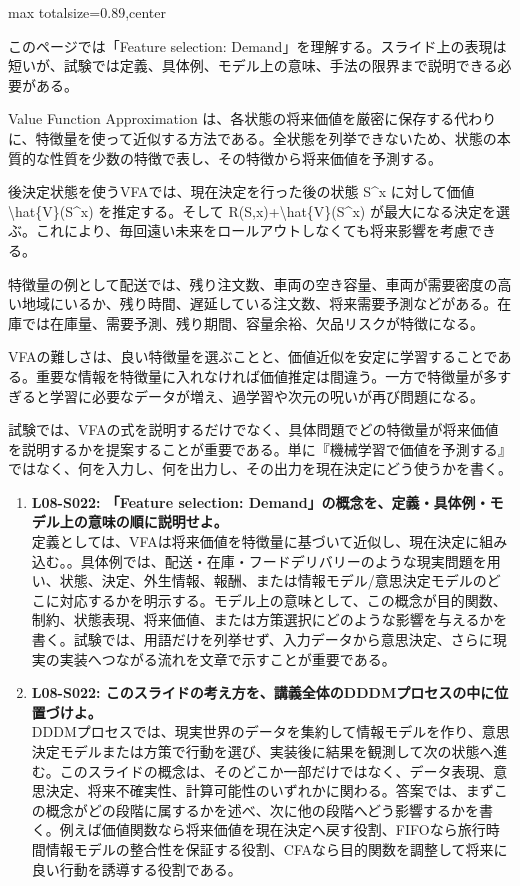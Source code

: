 \begin{minipage}[t]{0.58\textwidth}
\begin{adjustbox}{max totalsize={\textwidth}{0.89\textheight},center}
\begin{minipage}{\textwidth}\scriptsize
{}このページでは「Feature selection: Demand」を理解する。スライド上の表現は短いが、試験では定義、具体例、モデル上の意味、手法の限界まで説明できる必要がある。\par
Value Function Approximation は、各状態の将来価値を厳密に保存する代わりに、特徴量を使って近似する方法である。全状態を列挙できないため、状態の本質的な性質を少数の特徴で表し、その特徴から将来価値を予測する。\par
後決定状態を使うVFAでは、現在決定を行った後の状態 S\textasciicircum{}x に対して価値 \textbackslash{}hat\{V\}(S\textasciicircum{}x) を推定する。そして R(S,x)+\textbackslash{}hat\{V\}(S\textasciicircum{}x) が最大になる決定を選ぶ。これにより、毎回遠い未来をロールアウトしなくても将来影響を考慮できる。\par
特徴量の例として配送では、残り注文数、車両の空き容量、車両が需要密度の高い地域にいるか、残り時間、遅延している注文数、将来需要予測などがある。在庫では在庫量、需要予測、残り期間、容量余裕、欠品リスクが特徴になる。\par
VFAの難しさは、良い特徴量を選ぶことと、価値近似を安定に学習することである。重要な情報を特徴量に入れなければ価値推定は間違う。一方で特徴量が多すぎると学習に必要なデータが増え、過学習や次元の呪いが再び問題になる。\par
試験では、VFAの式を説明するだけでなく、具体問題でどの特徴量が将来価値を説明するかを提案することが重要である。単に『機械学習で価値を予測する』ではなく、何を入力し、何を出力し、その出力を現在決定にどう使うかを書く。\par{}\begin{enumerate}\item \textbf{L08-S022: 「Feature selection: Demand」の概念を、定義・具体例・モデル上の意味の順に説明せよ。}\\定義としては、VFAは将来価値を特徴量に基づいて近似し、現在決定に組み込む。。具体例では、配送・在庫・フードデリバリーのような現実問題を用い、状態、決定、外生情報、報酬、または情報モデル/意思決定モデルのどこに対応するかを明示する。モデル上の意味として、この概念が目的関数、制約、状態表現、将来価値、または方策選択にどのような影響を与えるかを書く。試験では、用語だけを列挙せず、入力データから意思決定、さらに現実の実装へつながる流れを文章で示すことが重要である。\item \textbf{L08-S022: このスライドの考え方を、講義全体のDDDMプロセスの中に位置づけよ。}\\DDDMプロセスでは、現実世界のデータを集約して情報モデルを作り、意思決定モデルまたは方策で行動を選び、実装後に結果を観測して次の状態へ進む。このスライドの概念は、そのどこか一部だけではなく、データ表現、意思決定、将来不確実性、計算可能性のいずれかに関わる。答案では、まずこの概念がどの段階に属するかを述べ、次に他の段階へどう影響するかを書く。例えば価値関数なら将来価値を現在決定へ戻す役割、FIFOなら旅行時間情報モデルの整合性を保証する役割、CFAなら目的関数を調整して将来に良い行動を誘導する役割である。\end{enumerate}

\end{minipage}
\end{adjustbox}
\end{minipage}
